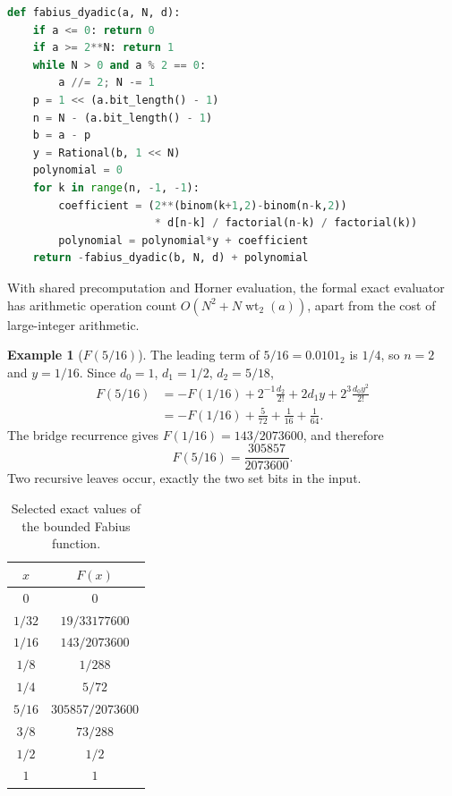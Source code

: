 \documentclass[11pt]{article}
\theoremstyle{definition}
\newtheorem{example}[theorem]{Example}
\theoremstyle{remark}
\newcommand{\wt}{\operatorname{wt}_2}\newcommand{\upfun}{\operatorname{up}}
\begin{document}
\begin{lstlisting}[language=Python,caption={Language-neutral exact evaluator.}]
def fabius_dyadic(a, N, d):
    if a <= 0: return 0
    if a >= 2**N: return 1
    while N > 0 and a % 2 == 0:
        a //= 2; N -= 1
    p = 1 << (a.bit_length() - 1)
    n = N - (a.bit_length() - 1)
    b = a - p
    y = Rational(b, 1 << N)
    polynomial = 0
    for k in range(n, -1, -1):
        coefficient = (2**(binom(k+1,2)-binom(n-k,2))
                       * d[n-k] / factorial(n-k) / factorial(k))
        polynomial = polynomial*y + coefficient
    return -fabius_dyadic(b, N, d) + polynomial
\end{lstlisting}

With shared precomputation and Horner evaluation, the formal exact evaluator has arithmetic operation count $O(N^2+N\wt(a))$, apart from the cost of large-integer arithmetic.

\begin{example}[$F(5/16)$]\label{ex:five-sixteen}
The leading term of $5/16=0.0101_2$ is $1/4$, so $n=2$ and $y=1/16$.  Since
$d_0=1$, $d_1=1/2$, $d_2=5/18$,
\begin{align*}
 F(5/16)
 &=-F(1/16)+2^{-1}\frac{d_2}{2!}
   +2d_1y+2^3\frac{d_0y^2}{2!}\\
 &=-F(1/16)+\frac5{72}+\frac1{16}+\frac1{64}.
\end{align*}
The bridge recurrence gives $F(1/16)=143/2073600$, and therefore
\begin{equation}\label{eq:five-sixteen}
 F(5/16)=\frac{305857}{2073600}.
\end{equation}
Two recursive leaves occur, exactly the two set bits in the input.
\end{example}

\begin{table}[htbp]\centering
\caption{Selected exact values of the bounded Fabius function.}\label{tab:values}
\begin{tabular}{@{}cc@{}}\toprule
$x$&$F(x)$\\\midrule
$0$&$0$\\
$1/32$&$19/33177600$\\
$1/16$&$143/2073600$\\
$1/8$&$1/288$\\
$1/4$&$5/72$\\
$5/16$&$305857/2073600$\\
$3/8$&$73/288$\\
$1/2$&$1/2$\\
$1$&$1$\\\bottomrule
\end{tabular}
\end{table}
\end{document}
